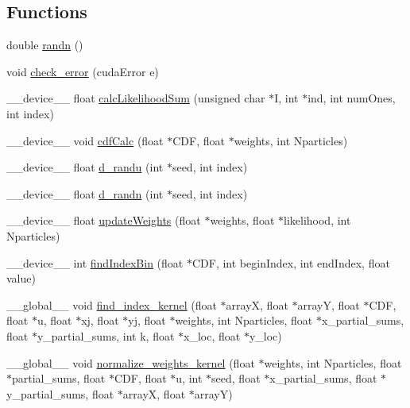 \subsection*{Functions}
\begin{DoxyCompactItemize}
\item 
double \hyperlink{ex__particle__CUDA__float_8cu_a03915aa2531cec7b68e3461c62968b90}{randn} ()
\item 
void \hyperlink{ex__particle__CUDA__float_8cu_a4a894e10d3ce85515e41ac09c7f052c3}{check\_\-error} (cudaError e)
\item 
\_\-\_\-device\_\-\_\- float \hyperlink{ex__particle__CUDA__float_8cu_a592624798f72165183279ecc92a2eea5}{calcLikelihoodSum} (unsigned char $\ast$I, int $\ast$ind, int numOnes, int index)
\item 
\_\-\_\-device\_\-\_\- void \hyperlink{ex__particle__CUDA__float_8cu_ac2312c222c3a30edb9076abc60561429}{cdfCalc} (float $\ast$CDF, float $\ast$weights, int Nparticles)
\item 
\_\-\_\-device\_\-\_\- float \hyperlink{ex__particle__CUDA__float_8cu_add17ca83d016a5c14fed14c87734ac8c}{d\_\-randu} (int $\ast$seed, int index)
\item 
\_\-\_\-device\_\-\_\- float \hyperlink{ex__particle__CUDA__float_8cu_ae73ea1d15de0775879be9d0457189f32}{d\_\-randn} (int $\ast$seed, int index)
\item 
\_\-\_\-device\_\-\_\- float \hyperlink{ex__particle__CUDA__float_8cu_a445a6138b006078cfdbd6314ced3ee73}{updateWeights} (float $\ast$weights, float $\ast$likelihood, int Nparticles)
\item 
\_\-\_\-device\_\-\_\- int \hyperlink{ex__particle__CUDA__float_8cu_a296be3d3e8ce2a2636c8658d703abf54}{findIndexBin} (float $\ast$CDF, int beginIndex, int endIndex, float value)
\item 
\_\-\_\-global\_\-\_\- void \hyperlink{ex__particle__CUDA__float_8cu_aef627a69a7a035b4e1c8038dffde6e69}{find\_\-index\_\-kernel} (float $\ast$arrayX, float $\ast$arrayY, float $\ast$CDF, float $\ast$u, float $\ast$xj, float $\ast$yj, float $\ast$weights, int Nparticles, float $\ast$x\_\-partial\_\-sums, float $\ast$y\_\-partial\_\-sums, int k, float $\ast$x\_\-loc, float $\ast$y\_\-loc)
\item 
\_\-\_\-global\_\-\_\- void \hyperlink{ex__particle__CUDA__float_8cu_a94ffbf2cd3138980704183149ffba404}{normalize\_\-weights\_\-kernel} (float $\ast$weights, int Nparticles, float $\ast$partial\_\-sums, float $\ast$CDF, float $\ast$u, int $\ast$seed, float $\ast$x\_\-partial\_\-sums, float $\ast$y\_\-partial\_\-sums, float $\ast$arrayX, float $\ast$arrayY)

\end{DoxyCompactItemize}
